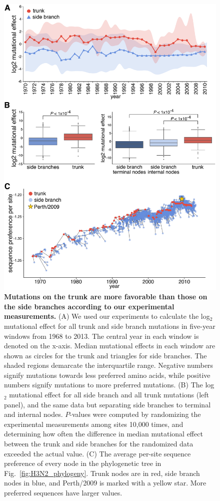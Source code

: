 \documentclass[9pt,twocolumn,twoside]{pnas-new}
\begin{document}
\begin{figure}
\centering
\includegraphics[width=\columnwidth]{figs/trunkvssidebranch/trunkvssidebranch.pdf}
\caption{\label{fig:trunkvssidebranch}
{\bf Mutations on the trunk are more favorable than those on the side branches according to our experimental measurements.}
(A) We used our experiments to calculate the log$_{2}$ mutational effect for all trunk and side branch mutations in five-year windows from 1968 to 2013. 
The central year in each window is denoted on the x-axis.
Median mutational effects in each window are shown as circles for the trunk and triangles for side branches. 
The shaded regions demarcate the interquartile range.
Negative numbers signify mutations towards less preferred amino acids, while positive numbers signify mutations to more preferred mutations.
(B) The log$_{2}$ mutational effect for all side branch and all trunk mutations (left panel), and the same data but separating side branches to terminal and internal nodes.
$P$-values were computed by randomizing the experimental measurements among sites 10,000 times, and determining how often the difference in median mutational effect between the trunk and side branches for the randomized data exceeded the actual value.
(C) The average per-site sequence preference of every node in the phylogenetic tree in Fig.~\ref{fig:H3N2_phylogeny}.
Trunk nodes are in red, side branch nodes in blue, and Perth/2009 is marked with a yellow star.
More preferred sequences have larger values.
}
\end{figure}
\end{document}
